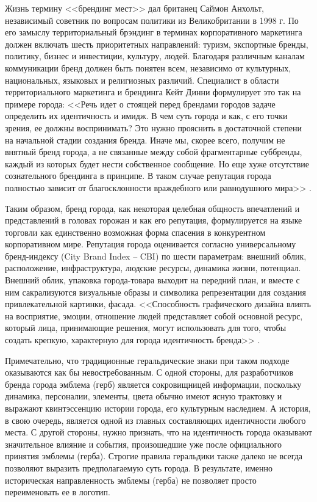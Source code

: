 Жизнь термину <<брендинг мест>> дал британец Саймон Анхольт, независимый советник по вопросам
политики из Великобритании в 1998 г. По его замыслу территориальный брэндинг в терминах
корпоративного маркетинга должен включать шесть приоритетных направлений: туризм, экспортные бренды,
политику, бизнес и инвестиции, культуру, людей. Благодаря различным каналам коммуникации бренд
должен быть понятен всем, независимо от культурных, национальных, языковых и религиозных
различий. Специалист в области территориального маркетинга и брендинга Кейт Динни формулирует это
так на примере города: <<Речь идет о стоящей перед брендами городов задаче определить их идентичность
и имидж. В чем суть города и как, с его точки зрения, ее должны воспринимать? Это нужно прояснить в
достаточной степени на начальной стадии создания бренда. Иначе мы, скорее всего, получим не внятный
бренд города, а не связанные между собой фрагментарные суббренды, каждый из которых будет нести
собственное сообщение. Но еще хуже отсутствие сознательного брендинга в принципе. В таком случае
репутация города полностью зависит от благосклонности враждебного или равнодушного
мира>> \autocite[][127-128]{book:dinni}.

Таким образом, бренд города, как некоторая  целебная общность впечатлений и представлений в головах
горожан и как его репутация, формулируется на языке торговли  как единственно возможная форма
спасения в конкурентном корпоративном мире. Репутация города оценивается согласно универсальному
бренд-индексу (City Brand Index -- CBI) по шести параметрам: внешний облик, расположение,
инфраструктура, людские ресурсы, динамика жизни, потенциал. Внешний облик, упаковка города-товара
выходит на передний план,  и вместе с ним сакрализуются визуальные образы и символика репрезентации
для создания привлекательной картинки, фасада. <<Способность графического дизайна влиять на
восприятие, эмоции, отношение людей представляет собой основной ресурс, который лица, принимающие
решения, могут использовать для того, чтобы создать крепкую, характерную для города идентичность
бренда>> \autocite[][267]{book:dinni}.

Примечательно, что традиционные геральдические знаки при таком подходе оказываются как бы
невостребованным. С одной стороны, для разработчиков бренда города эмблема (герб) является
сокровищницей информации, поскольку динамика, персоналии, элементы, цвета обычно имеют ясную
трактовку и выражают квинтэссенцию истории города, его культурным наследием. А история, в свою
очередь, является одной из главных составляющих идентичности любого места. С другой стороны, нужно
признать, что на идентичность города оказывают значительное влияние и события, произошедшие уже
после официального принятия эмблемы (герба). Строгие правила геральдики также далеко не всегда
позволяют выразить предполагаемую суть города. В результате, именно историческая направленность
эмблемы (герба) не позволяет просто переименовать ее  в логотип.

